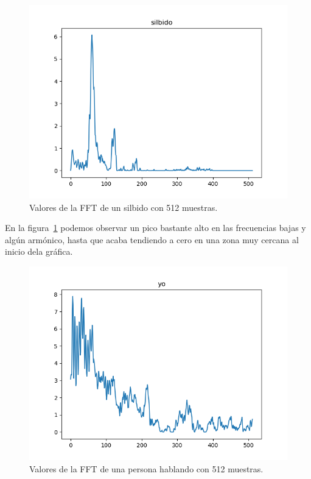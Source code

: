 \documentclass[a4paper, 12pt]{book}
\begin{document}

\begin{figure}
	\centering
	\includegraphics[width=12cm, keepaspectratio]{img/silbido512.png}
	\caption{Valores de la FFT de un silbido con 512 muestras.}\label{fig:silbido}
\end{figure}

En la figura~\ref{fig:silbido} podemos observar un pico bastante alto en las frecuencias bajas y algún armónico, hasta que acaba tendiendo a cero en una zona muy cercana al inicio dela gráfica.

\begin{figure}
	\centering
	\includegraphics[width=12cm, keepaspectratio]{img/yo512.png}
	\caption{Valores de la FFT de una persona hablando con 512 muestras.}\label{fig:yo}
\end{figure}
\end{document}
